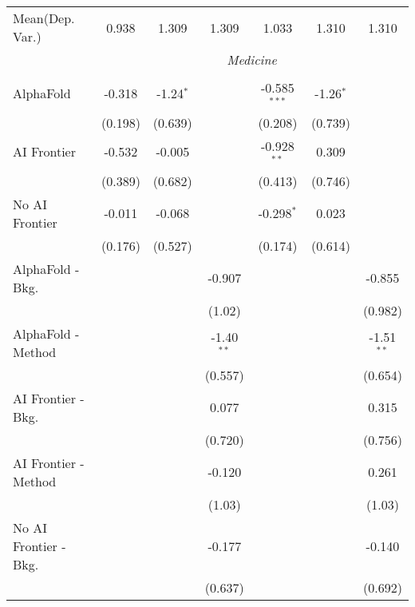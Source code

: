 \begin{tabular}{lcccccc}
Mean(Dep. Var.) & 0.938 & 1.309 & 1.309 & 1.033 & 1.310 & 1.310 \\
 & \multicolumn{6}{c}{\textit{Medicine}} \\ \\
   AlphaFold               & -0.318  & -1.24$^{*}$ &              & -0.585$^{***}$ & -1.26$^{*}$ &   \\   
                           & (0.198) & (0.639)     &              & (0.208)        & (0.739)     &   \\   
   AI Frontier             & -0.532  & -0.005      &              & -0.928$^{**}$  & 0.309       &   \\   
                           & (0.389) & (0.682)     &              & (0.413)        & (0.746)     &   \\   
   No AI Frontier          & -0.011  & -0.068      &              & -0.298$^{*}$   & 0.023       &   \\   
                           & (0.176) & (0.527)     &              & (0.174)        & (0.614)     &   \\   
   AlphaFold - Bkg.        &         &             & -0.907       &                &             & -0.855\\   
                           &         &             & (1.02)       &                &             & (0.982)\\   
   AlphaFold - Method      &         &             & -1.40$^{**}$ &                &             & -1.51$^{**}$\\   
                           &         &             & (0.557)      &                &             & (0.654)\\   
   AI Frontier - Bkg.      &         &             & 0.077        &                &             & 0.315\\   
                           &         &             & (0.720)      &                &             & (0.756)\\   
   AI Frontier - Method    &         &             & -0.120       &                &             & 0.261\\   
                           &         &             & (1.03)       &                &             & (1.03)\\   
   No AI Frontier - Bkg.   &         &             & -0.177       &                &             & -0.140\\   
                           &         &             & (0.637)      &                &             & (0.692)\\   

\end{tabular}
